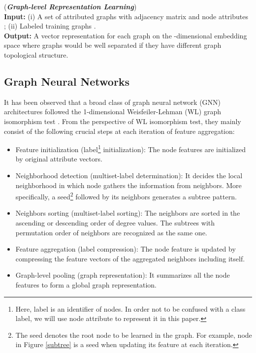 \documentclass[sigconf]{acmart}
\begin{document}
\begin{definition}(\textit{\textbf{Graph-level Representation Learning}}) \\
\indent \textbf{Input:} (i) A set of attributed graphs  with adjacency matrix  and node attributes ; (ii) Labeled training graphs . \\
\indent \textbf{Output:} A vector representation  for each graph  on the -dimensional embedding space where graphs would be well separated if they have different graph topological structure.
\end{definition}

\subsection{Graph Neural Networks}
It has been observed that a broad class of graph neural network (GNN) architectures followed the 1-dimensional Weisfeiler-Lehman (WL) graph isomorphism test \cite{weisfeiler1968reduction}. From the perspective of WL isomorphism test, they mainly consist of the following crucial steps at each iteration of feature aggregation:
\begin{itemize}
\item Feature initialization (label\footnote{ Here, label is an identifier of nodes. In order not to be confused with a class label, we will use node attribute to represent it in this paper.} initialization): The node features are initialized by original attribute vectors.
\item Neighborhood detection (multiset-label determination): It decides the local neighborhood in which node gathers the information from neighbors. More specifically, a seed\footnote{The seed denotes the root node to be learned in the graph. For example, node  in Figure \ref{subtree} is a seed when updating its feature at each iteration.} followed by its neighbors generates a subtree pattern.
\item Neighbors sorting (multiset-label sorting): The neighbors are sorted in the ascending or descending order of degree values. The subtrees with permutation order of neighbors are recognized as the same one.
\item Feature aggregation (label compression): The node feature is updated by compressing the feature vectors of the aggregated neighbors including itself.
\item Graph-level pooling (graph representation): It summarizes all the node features to form a global graph representation.
\end{itemize}
\end{document}

